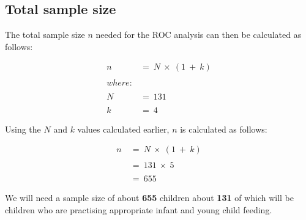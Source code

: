 \documentclass[12pt,a4paper]{article}
\theoremstyle{definition}
\theoremstyle{definition}
\theoremstyle{definition}
\theoremstyle{remark}
\begin{document}
\hypertarget{total-sample-size}{%
\subsection{Total sample size}\label{total-sample-size}}

The total sample size \(n\) needed for the ROC analysis can then be
calculated as follows:

\[ \begin{aligned}
n ~ & = ~ N ~ \times ~ (1 ~ + ~ k)\\
\\
where: & \\
\\
N ~ & = ~ 131 \\
\\
k ~ & = ~ 4
\end{aligned} \]

Using the \(N\) and \(k\) values calculated earlier, \(n\) is calculated
as follows:

\[ \begin{aligned}
n ~ & = ~ N ~ \times ~ (1 ~ + ~ k)\\
\\
& = ~ 131 ~ \times ~ 5 \\
\\
& = ~ 655
\end{aligned} \]

We will need a sample size of about \textbf{655} children about
\textbf{131} of which will be children who are practising appropriate
infant and young child feeding.


\end{document}
